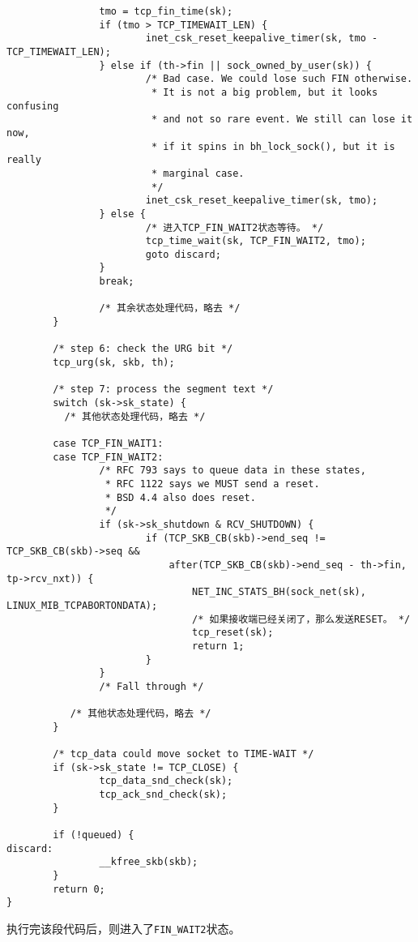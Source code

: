 \begin{verbatim}
                tmo = tcp_fin_time(sk);
                if (tmo > TCP_TIMEWAIT_LEN) {
                        inet_csk_reset_keepalive_timer(sk, tmo - TCP_TIMEWAIT_LEN);
                } else if (th->fin || sock_owned_by_user(sk)) {
                        /* Bad case. We could lose such FIN otherwise.
                         * It is not a big problem, but it looks confusing
                         * and not so rare event. We still can lose it now,
                         * if it spins in bh_lock_sock(), but it is really
                         * marginal case.
                         */
                        inet_csk_reset_keepalive_timer(sk, tmo);
                } else {
                        /* 进入TCP_FIN_WAIT2状态等待。 */
                        tcp_time_wait(sk, TCP_FIN_WAIT2, tmo);
                        goto discard;
                }
                break;

                /* 其余状态处理代码，略去 */
        }

        /* step 6: check the URG bit */
        tcp_urg(sk, skb, th);

        /* step 7: process the segment text */
        switch (sk->sk_state) {
          /* 其他状态处理代码，略去 */

        case TCP_FIN_WAIT1:
        case TCP_FIN_WAIT2:
                /* RFC 793 says to queue data in these states,
                 * RFC 1122 says we MUST send a reset.
                 * BSD 4.4 also does reset.
                 */
                if (sk->sk_shutdown & RCV_SHUTDOWN) {
                        if (TCP_SKB_CB(skb)->end_seq != TCP_SKB_CB(skb)->seq &&
                            after(TCP_SKB_CB(skb)->end_seq - th->fin, tp->rcv_nxt)) {
                                NET_INC_STATS_BH(sock_net(sk), LINUX_MIB_TCPABORTONDATA);
                                /* 如果接收端已经关闭了，那么发送RESET。 */
                                tcp_reset(sk);
                                return 1;
                        }
                }
                /* Fall through */

           /* 其他状态处理代码，略去 */
        }

        /* tcp_data could move socket to TIME-WAIT */
        if (sk->sk_state != TCP_CLOSE) {
                tcp_data_snd_check(sk);
                tcp_ack_snd_check(sk);
        }

        if (!queued) {
discard:
                __kfree_skb(skb);
        }
        return 0;
}
\end{verbatim}
执行完该段代码后，则进入了\texttt{FIN_WAIT2}状态。

